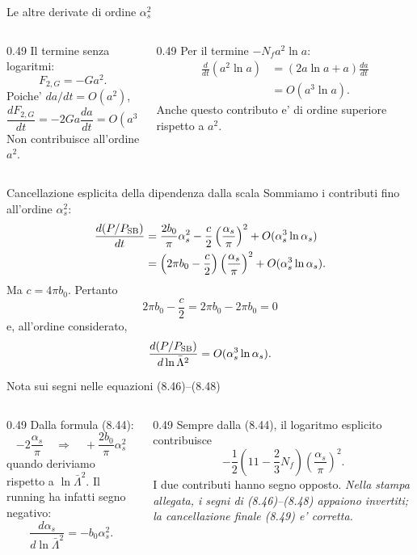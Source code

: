 \begin{frame}{Le altre derivate di ordine $\alpha_s^2$}
\small
\begin{columns}[T,onlytextwidth]
\begin{column}{0.49\textwidth}
Il termine senza logaritmi:
\[
F_{2,G}=-Ga^2.
\]
Poiche' $da/dt=O(a^2)$,
\[
\frac{dF_{2,G}}{dt}
=-2Ga\frac{da}{dt}=O(a^3).
\]
Non contribuisce all'ordine $a^2$.
\end{column}
\begin{column}{0.49\textwidth}
Per il termine $-N_fa^2\ln a$:
\[
\begin{aligned}
\frac{d}{dt}(a^2\ln a)
&=(2a\ln a+a)\frac{da}{dt}\\
&=O(a^3\ln a).
\end{aligned}
\]
Anche questo contributo e' di ordine superiore
rispetto a $a^2$.
\end{column}
\end{columns}
\end{frame}

\begin{frame}{Cancellazione esplicita della dipendenza dalla scala}
\small
Sommiamo i contributi fino all'ordine $\alpha_s^2$:
\[
\begin{aligned}
\frac{d(P/P_{\rm SB})}{dt}
&=\frac{2b_0}{\pi}\alpha_s^2
-\frac c2\left(\frac{\alpha_s}{\pi}\right)^2
+O(\alpha_s^3\ln\alpha_s)\\
&=\left(2\pi b_0-\frac c2\right)
\left(\frac{\alpha_s}{\pi}\right)^2
+O(\alpha_s^3\ln\alpha_s).
\end{aligned}
\]
Ma $c=4\pi b_0$. Pertanto
\[
2\pi b_0-\frac c2
=2\pi b_0-2\pi b_0=0
\]
e, all'ordine considerato,
\[
\frac{d(P/P_{\rm SB})}{d\ln\bar\Lambda^2}
=O(\alpha_s^3\ln\alpha_s).
\]
\end{frame}

\begin{frame}{Nota sui segni nelle equazioni (8.46)--(8.48)}
\small
\begin{columns}[T,onlytextwidth]
\begin{column}{0.49\textwidth}
Dalla formula (8.44):
\[
-2\frac{\alpha_s}{\pi}
\quad\Longrightarrow\quad
+\frac{2b_0}{\pi}\alpha_s^2
\]
quando deriviamo rispetto a
$\ln\bar\Lambda^2$.
\medskip
Il running ha infatti segno negativo:
\[
\frac{d\alpha_s}{d\ln\bar\Lambda^2}
=-b_0\alpha_s^2.
\]
\end{column}
\begin{column}{0.49\textwidth}
Sempre dalla (8.44), il logaritmo esplicito
contribuisce
\[
-\frac12\left(11-\frac23N_f\right)
\left(\frac{\alpha_s}{\pi}\right)^2.
\]
I due contributi hanno segno opposto.
\medskip
\emph{Nella stampa allegata, i segni di
(8.46)--(8.48) appaiono invertiti; la
cancellazione finale (8.49) e' corretta.}
\end{column}
\end{columns}
\end{frame}


